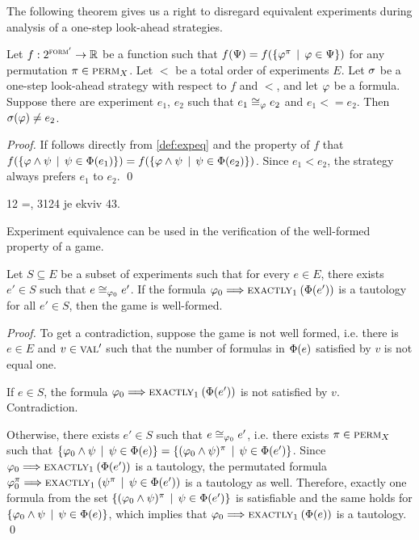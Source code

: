 The following theorem gives us a right to disregard equivalent experiments
  during analysis of a one-step look-ahead strategies.

\begin{theorem}
Let $f: 2^{\textsc{form}'} ->\mathbb{R}$ be a function such that
$f(\Psi) = f(\{\varphi^\pi \:\:|\:\: \varphi\in\Psi\})$ for any permutation
$\pi\in\textsc{perm}_X$. Let $<$ be a total order of experiments $E$.
Let $\sigma$ be a one-step look-ahead strategy with respect to $f$ and $<$, and
let $\varphi$ be a formula.
Suppose there are experiment $e_1$, $e_2$ such that $e_1\cong_{\varphi}e_2$ and $e_1<=e_2$.
Then $\sigma(\varphi) \not= e_2$.
\end{theorem}

\begin{proof}
If follows directly from \autoref{def:expeq} and the property of $f$ that
$f(\{\varphi\wedge\psi\:\:|\:\: \psi\in\Phi(e_1)\}) =
 f(\{\varphi\wedge\psi\:\:|\:\: \psi\in\Phi(e_2)\})$.
Since $e_1 < e_2$, the strategy always prefers $e_1$ to $e_2$. \qed
\end{proof}

\begin{example}
12 =, 3124 je ekviv 43. \eqed
\end{example}

Experiment equivalence can be used in the verification
  of the well-formed property of a game.

\begin{lemma} \label{lma:well-formed}
  Let $S\subseteq E$ be a subset of experiments
  such that for every $e\in E$, there exists $e'\in S$
   such that $e\cong_{\varphi_0}e'$.
  If the formula $\varphi_0 ==> \textsc{exactly}_{1}\:(\Phi(e'))$ is a tautology for
  all $e'\in S$, then the game is well-formed.
\end{lemma}

\begin{proof}
To get a contradiction, suppose the game is not well formed, i.e.
  there is $e\in E$ and $v \in \textsc{val}'$ such that the number of
  formulas in $\Phi(e)$ satisfied by $v$ is not equal one.

If $e\in S$, the formula $\varphi_0 ==> \textsc{exactly}_{1}\:(\Phi(e'))$ is not
  satisfied by $v$. Contradiction.

Otherwise, there exists $e'\in S$ such that $e\cong_{\varphi_0}e'$, i.e.
  there exists $\pi\in\textsc{perm}_X$ such that
$\{ \varphi_0\wedge\psi \:\:|\:\: \psi\in\Phi(e) \} =
 \{ (\varphi_0\wedge\psi)^\pi \:\:|\:\: \psi\in\Phi(e') \}$.
Since $\varphi_0 ==> \textsc{exactly}_{1}\:(\Phi(e'))$ is a tautology,
  the permutated formula
  $\varphi_0^\pi ==> \textsc{exactly}_{1}\:(\psi^\pi \:\:|\:\: \psi\in\Phi(e'))$
  is a tautology as well.
Therefore, exactly one formula from the set
 $ \{ (\varphi_0\wedge\psi)^\pi \:\:|\:\: \psi\in\Phi(e') \}$
 is satisfiable and the same holds for
  $\{ \varphi_0\wedge\psi \:\:|\:\: \psi\in\Phi(e) \}$,
 which implies that
 $\varphi_0 ==> \textsc{exactly}_{1}\:(\Phi(e))$
 is a tautology. \qed
\end{proof}


